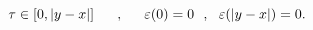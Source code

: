 \begin{equation}
\tau \in [0, |y-x|]\makebox[.5in]{,} \varepsilon (0)=0~~,~~\varepsilon(|y-x|)=0.
\label{bcond}
\end{equation}

